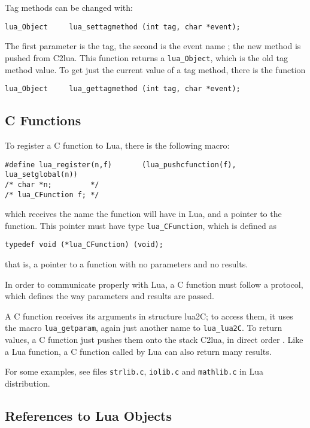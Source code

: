 Tag methods can be changed with:
\begin{verbatim}
lua_Object     lua_settagmethod (int tag, char *event);
\end{verbatim}
The first parameter is the tag,
the second is the event name ;
the new method is pushed from C2lua.
This function returns a \verb|lua_Object|,
which is the old tag method value.
To get just the current value of a tag method,
there is the function
\begin{verbatim}
lua_Object     lua_gettagmethod (int tag, char *event);
\end{verbatim}


\subsection{C Functions} \label{LuacallC}
To register a C function to Lua,
there is the following macro:
\begin{verbatim}
#define lua_register(n,f)       (lua_pushcfunction(f), lua_setglobal(n))
/* char *n;         */
/* lua_CFunction f; */
\end{verbatim}
which receives the name the function will have in Lua,
and a pointer to the function.
This pointer must have type \verb|lua_CFunction|,
which is defined as
\begin{verbatim}
typedef void (*lua_CFunction) (void);
\end{verbatim}
that is, a pointer to a function with no parameters and no results.

In order to communicate properly with Lua,
a C function must follow a protocol,
which defines the way parameters and results are passed.

A C function receives its arguments in structure lua2C;
to access them, it uses the macro \verb|lua_getparam|, 
again just another name to \verb|lua_lua2C|.
To return values, a C function just pushes them onto the stack C2lua,
in direct order .
Like a Lua function, a C function called by Lua can also return
many results.

For some examples, see files \verb|strlib.c|,
\verb|iolib.c| and \verb|mathlib.c| in Lua distribution.

\subsection{References to Lua Objects}

